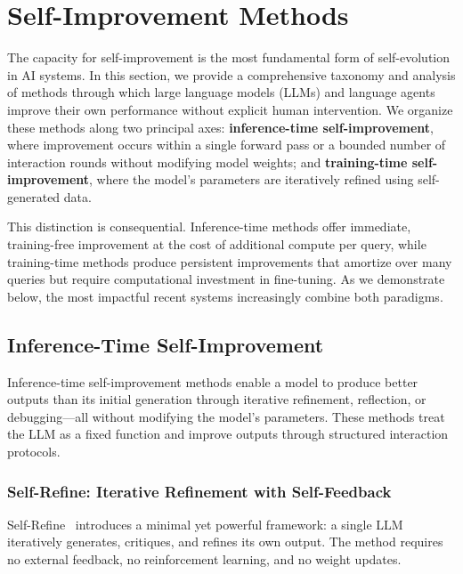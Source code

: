 \section{Self-Improvement Methods}
\label{sec:self-improvement}

The capacity for self-improvement is the most fundamental form of self-evolution in AI systems. In this section, we provide a comprehensive taxonomy and analysis of methods through which large language models (LLMs) and language agents improve their own performance without explicit human intervention. We organize these methods along two principal axes: \textbf{inference-time self-improvement}, where improvement occurs within a single forward pass or a bounded number of interaction rounds without modifying model weights; and \textbf{training-time self-improvement}, where the model's parameters are iteratively refined using self-generated data.

This distinction is consequential. Inference-time methods offer immediate, training-free improvement at the cost of additional compute per query, while training-time methods produce persistent improvements that amortize over many queries but require computational investment in fine-tuning. As we demonstrate below, the most impactful recent systems increasingly combine both paradigms.

\subsection{Inference-Time Self-Improvement}
\label{sec:inference-time}

Inference-time self-improvement methods enable a model to produce better outputs than its initial generation through iterative refinement, reflection, or debugging---all without modifying the model's parameters. These methods treat the LLM as a fixed function and improve outputs through structured interaction protocols.

\subsubsection{Self-Refine: Iterative Refinement with Self-Feedback}
\label{sec:self-refine}

Self-Refine~\citep{madaan2023selfrefine} introduces a minimal yet powerful framework: a single LLM iteratively generates, critiques, and refines its own output. The method requires no external feedback, no reinforcement learning, and no weight updates.


